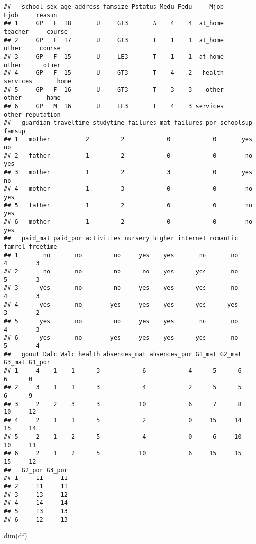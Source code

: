 \documentclass[
]{article}
\newenvironment{Shaded}{\begin{snugshade}}{\end{snugshade}}
\newcommand{\FunctionTok}[1]{\textcolor[rgb]{0.00,0.00,0.00}{#1}}
\newcommand{\NormalTok}[1]{#1}
\begin{document}
\begin{verbatim}
##   school sex age address famsize Pstatus Medu Fedu     Mjob     Fjob     reason
## 1     GP   F  18       U     GT3       A    4    4  at_home  teacher     course
## 2     GP   F  17       U     GT3       T    1    1  at_home    other     course
## 3     GP   F  15       U     LE3       T    1    1  at_home    other      other
## 4     GP   F  15       U     GT3       T    4    2   health services       home
## 5     GP   F  16       U     GT3       T    3    3    other    other       home
## 6     GP   M  16       U     LE3       T    4    3 services    other reputation
##   guardian traveltime studytime failures_mat failures_por schoolsup famsup
## 1   mother          2         2            0            0       yes     no
## 2   father          1         2            0            0        no    yes
## 3   mother          1         2            3            0       yes     no
## 4   mother          1         3            0            0        no    yes
## 5   father          1         2            0            0        no    yes
## 6   mother          1         2            0            0        no    yes
##   paid_mat paid_por activities nursery higher internet romantic famrel freetime
## 1       no       no         no     yes    yes       no       no      4        3
## 2       no       no         no      no    yes      yes       no      5        3
## 3      yes       no         no     yes    yes      yes       no      4        3
## 4      yes       no        yes     yes    yes      yes      yes      3        2
## 5      yes       no         no     yes    yes       no       no      4        3
## 6      yes       no        yes     yes    yes      yes       no      5        4
##   goout Dalc Walc health absences_mat absences_por G1_mat G2_mat G3_mat G1_por
## 1     4    1    1      3            6            4      5      6      6      0
## 2     3    1    1      3            4            2      5      5      6      9
## 3     2    2    3      3           10            6      7      8     10     12
## 4     2    1    1      5            2            0     15     14     15     14
## 5     2    1    2      5            4            0      6     10     10     11
## 6     2    1    2      5           10            6     15     15     15     12
##   G2_por G3_por
## 1     11     11
## 2     11     11
## 3     13     12
## 4     14     14
## 5     13     13
## 6     12     13
\end{verbatim}

\begin{Shaded}
\begin{Highlighting}[]
\FunctionTok{dim}\NormalTok{(df)}
\end{Highlighting}
\end{Shaded}
\end{document}
